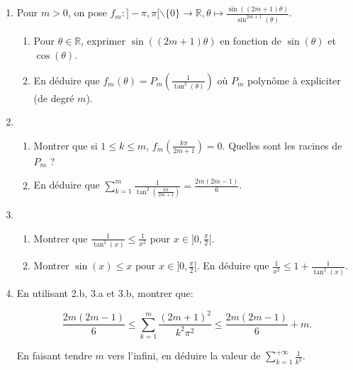 \documentclass{article}
\newcommand{\mb}[1]{\mathbb{#1}}
\begin{document}
\begin{enumerate}

\item Pour $m > 0$, on pose $f_m: ]- \pi, \pi [ \smallsetminus \{0\} \rightarrow \mb{R}, \theta \mapsto \frac{\sin((2m+1)\theta)}{\sin^{2m+1}(\theta)}$.

\begin{enumerate}

\item Pour $\theta \in \mb{R}$, exprimer $\sin((2m+1)\theta)$ en fonction de $\sin(\theta)$ et $\cos(\theta)$.

\item En déduire que $f_m(\theta) = P_m(\frac{1}{\tan^2(\theta)})$ où $P_m$ polynôme à expliciter (de degré $m$).

\end{enumerate}

\item \begin{enumerate}

\item Montrer que si $1 \le k \le m$, $f_m(\frac{k \pi}{2m+1}) = 0$. Quelles sont les racines de $P_m$ ?

\item En déduire que $\displaystyle \sum_{k=1}^m \frac{1}{\tan^2(\frac{k\pi}{2m+1})} = \frac{2m(2m-1)}{6}$.

\end{enumerate}

\item \begin{enumerate}

\item Montrer que $\frac{1}{\tan^2(x)} \le \frac{1}{x^2}$ pour $x \in ]0, \frac{\pi}{2}[$.

\item Montrer $\sin(x) \le x$ pour $x \in ]0, \frac{\pi}{2}[$. En déduire que $\frac{1}{x^2} \le 1 + \frac{1}{\tan^2(x)}$.

\end{enumerate}

\item En utilisant 2.b, 3.a et 3.b, montrer que:

$$\frac{2m(2m-1)}{6} \le \sum_{k=1}^m \frac{(2m+1)^2}{k^2 \pi^2} \le \frac{2m(2m-1)}{6} + m.$$

En faisant tendre $m$ vers l'infini, en déduire la valeur de $\displaystyle \sum_{k=1}^{+ \infty} \frac{1}{k^2}$. 

\end{enumerate}
\end{document}
